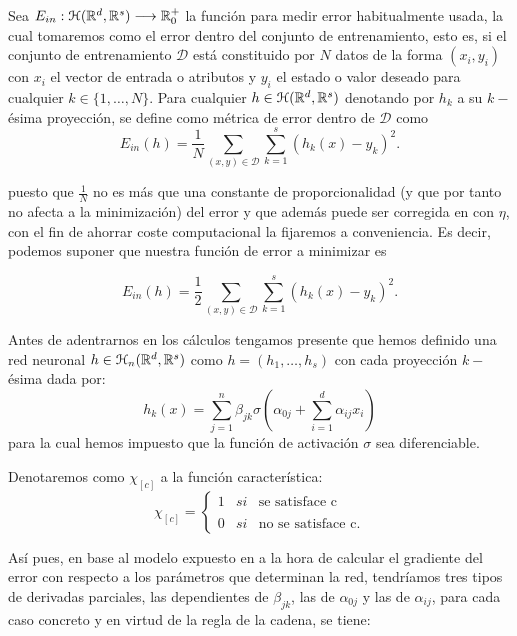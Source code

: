  Sea $E_{in} : \mathcal{H}(\mathbb{R}^d,\mathbb{R}^s) \longrightarrow \mathbb{R}^+_0$ la función para medir error habitualmente usada, la cual tomaremos como el error dentro del conjunto de entrenamiento, esto es,  si el conjunto 
de entrenamiento $\mathcal{D}$ está constituido por $N$ datos de la forma $(x_i, y_i)$ con $x_i$ el vector de entrada o atributos y $y_i$ el estado o valor deseado para cualquier $k\in \{1, \ldots, N\}.$ Para cualquier $h \in \mathcal{H}(\mathbb{R}^d,\mathbb{R}^s)$ denotando por $h_k$ a su $k-$ésima proyección, se define como métrica de error dentro de $\mathcal{D}$ como
\begin{equation}
    E_{in}(h) = \frac{1}{N} \sum_{(x,y) \in \mathcal{D}} \sum_{k=1}^s(h_k(x)- y_k)^2. 
\end{equation}

puesto que $\frac{1}{N}$ no es más que una constante de proporcionalidad (y que por tanto no afecta a la minimización) del error y que además 
puede ser corregida en  con $\eta$, con el fin de ahorrar coste computacional la 
fijaremos a conveniencia. Es decir, podemos suponer que 
nuestra función de error a minimizar es 

\begin{equation}
    E_{in}(h) = \frac{1}{2} \sum_{(x,y) \in \mathcal{D}} \sum_{k=1}^s (h_k(x)- y_k)^2. 
\end{equation}

Antes de adentrarnos en los cálculos tengamos presente que hemos definido una red neuronal  $h \in \mathcal{H}_n (\mathbb{R}^d, \mathbb{R}^s)$ como $h= (h_1, \ldots, h_s)$ con cada proyección $k-$ésima dada por: 
\begin{equation}\label{eq:red-neuronal-que-aprender}
    h_k(x) = 
    \sum_{j=1}^n \beta_{j k}
    \sigma
    \left(  
        \alpha_{0 j} +
        \sum_{i=1}^d \alpha_{i j}x_i
    \right)
\end{equation}
para la cual hemos impuesto que la función de activación $\sigma$ sea diferenciable.

Denotaremos como $\chi_{[c]}$ a la función característica:
\begin{equation}
    \chi_{[c]}= \left\{ \begin{array}{lcc}
        1 &   si  &  \text{se satisface c} \\
        \\ 0 &  si  & \text{no se satisface c.} 
        \end{array}
    \right. 
\end{equation}

Así pues, en base al modelo expuesto en  a la hora de calcular el gradiente del error con respecto a los parámetros que determinan la red, tendríamos tres tipos de derivadas parciales, las dependientes de $\beta_{j  k}$, 
las de $\alpha_{0 j}$ y las de $\alpha_{i j}$, para cada caso concreto y en virtud de la regla de la cadena, se tiene: 

